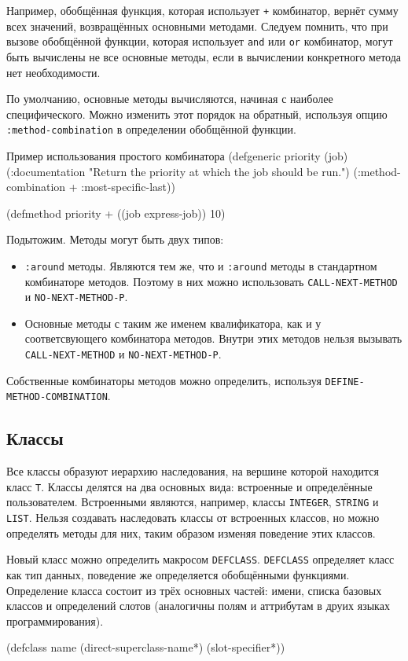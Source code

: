 Например, обобщённая функция, которая использует \lstinline{+} комбинатор, вернёт сумму всех значений, возвращённых основными методами. Следуем помнить, что при вызове обобщённой функции, которая использует \lstinline{and} или \lstinline{or} комбинатор, могут быть вычислены не все основные методы, если в вычислении конкретного метода нет необходимости.

По умолчанию, основные методы вычисляются, начиная с наиболее специфического. Можно изменить этот порядок на обратный, используя опцию \lstinline{:method-combination} в определении обобщённой функции.

\begin{cllst}{Пример использования простого комбинатора}{}
(defgeneric priority (job)
  (:documentation "Return the priority at which the job should be run.")
  (:method-combination + :most-specific-last))

(defmethod priority + ((job express-job)) 10)
\end{cllst}

Подытожим. Методы могут быть двух типов:
\begin{itemize}
  \item \lstinline{:around} методы. Являются тем же, что и \lstinline{:around} методы в стандартном комбинаторе методов. Поэтому в них можно использовать \lstinline{CALL-NEXT-METHOD} и \lstinline{NO-NEXT-METHOD-P}.
  \item Основные методы с таким же именем квалификатора, как и у соответсвующего комбинатора методов. Внутри этих методов нельзя вызывать \lstinline{CALL-NEXT-METHOD} и \lstinline{NO-NEXT-METHOD-P}.
\end{itemize}

Собственные комбинаторы методов можно определить, используя \lstinline{DEFINE-METHOD-COMBINATION}.

\subsection{Классы}
Все классы образуют иерархию наследования, на вершине которой находится класс \lstinline{T}. Классы делятся на два основных вида: встроенные и определённые пользователем. Встроенными являются, например, классы \lstinline{INTEGER}, \lstinline{STRING} и \lstinline{LIST}. Нельзя создавать наследовать классы от встроенных классов, но можно определять методы для них, таким образом изменяя поведение этих классов.

Новый класс можно определить макросом \lstinline{DEFCLASS}. \lstinline{DEFCLASS} определяет класс как тип данных, поведение же определяется обобщёнными функциями. Определение класса состоит из трёх основных частей: имени, списка базовых классов и определений слотов (аналогичны полям и аттрибутам в друих языках программирования).
\begin{cllst}{}{}
(defclass name (direct-superclass-name*)
  (slot-specifier*))
\end{cllst}

